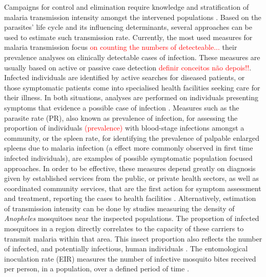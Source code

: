 Campaigns for control and elimination require knowledge and stratification of malaria transmission intensity amongst the intervened populations \cite{who2017framework, who2015guidelines}.
Based on the parasites' life cycle and its influencing determinants, several approaches can be used to estimate such transmission rate.
Currently, the most used measures for malaria transmission focus \textcolor{red}{on counting the numbers of detecteable...} their prevalence analyses on clinically detectable cases of infection.
These measures are usually based on active or passive case detection \cite{who2017framework,doolan2002malaria} \textcolor{red}{definir conceitos não depois!!}.
Infected individuals are identified by active searches for diseased patients, or those symptomatic patients come into specialised health facilities seeking care for their illness.
In both situations, analyses are performed %
on individuals presenting symptoms that evidence a possible case of infection \cite{who2017framework}.
Measures such as the parasite rate (PR), also known as prevalence of infection, for assessing the proportion of individuals \textcolor{red}{(prevalence)} with blood-stage infections amongst a community, or the spleen rate, for identifying the prevalence of palpable enlarged spleens due to malaria infection (a effect more commonly observed in first time infected individuals), are examples of possible symptomatic population focused approaches.
In order to be effective, these measures depend greatly on diagnosis %
given by established services from the public, or private health sectors, as well as coordinated community services, that are the first action for symptom assessment and treatment, reporting the cases to health facilities \cite{who2017framework}.
Alternatively, estimation of transmission intensity can be done by studies measuring the density of \textit{Anopheles} mosquitoes near the inspected populations.
The proportion of infected mosquitoes in a region directly correlates to the capacity of these carriers to transmit malaria within that area.
This insect proportion also reflects the number of infected, and potentially infectious, human individuals \cite{who2015guidelines}.
The entomological inoculation rate (EIR) measures the number of infective mosquito bites received per person, in a population, over a defined period of time \cite{who2017framework}.

